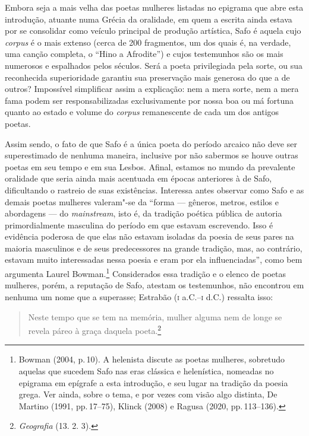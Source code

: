 Embora seja a mais velha das poetas mulheres listadas no epigrama que abre esta
introdução, atuante numa Grécia da oralidade, em quem a escrita ainda estava
por se consolidar como veículo principal de produção artística, Safo é aquela
cujo \textit{corpus} é o mais extenso (cerca de 200 fragmentos, um dos quais é,
na verdade, uma canção completa, o “Hino a Afrodite”) e cujos testemunhos são
os mais numerosos e espalhados pelos séculos. Será a poeta
privilegiada pela sorte, ou sua reconhecida superioridade garantiu sua
preservação mais generosa do que a de outros?
Impossível simplificar assim a explicação:
nem a mera sorte, nem a mera fama podem ser responsabilizadas exclusivamente por
nossa boa ou má fortuna quanto ao estado e volume do \textit{corpus}
remanescente de cada um dos antigos poetas.

Assim sendo, o fato de que Safo é a única poeta do período
arcaico não deve ser superestimado de nenhuma maneira, inclusive por não sabermos se houve outras poetas em seu tempo e em sua Lesbos. Afinal, estamos no mundo da prevalente oralidade que seria ainda mais acentuada em épocas anteriores à de Safo, dificultando o rastreio de suas existências. Interessa antes observar como Safo e as demais poetas mulheres valeram"-se da ``forma --- gêneros, metros, estilos e abordagens --- do \emph{mainstream}, isto é, da tradição poética pública de autoria primordialmente masculina do período em que estavam escrevendo. Isso é evidência poderosa de que elas não estavam isoladas da poesia de seus pares na maioria masculinos e de seus predecessores na grande tradição, mas, ao contrário, estavam muito interessadas nessa poesia e eram por ela influenciadas'', como bem argumenta Laurel Bowman.\footnote{Bowman (2004, p.\,10). A helenista discute as poetas mulheres, sobretudo aquelas que sucedem Safo nas eras clássica e helenística, nomeadas no epigrama em epígrafe a esta introdução, e seu lugar na tradição da poesia grega. Ver ainda, sobre o tema, e por vezes com visão algo distinta, De Martino (1991, pp.\,17--75), Klinck (2008) e Ragusa (2020, pp.\,113--136).}
Considerados essa tradição e o elenco de poetas mulheres, porém,
a reputação de Safo, atestam os
testemunhos, não encontrou em nenhuma um nome que a
superasse; Estrabão (\textsc{i} a.C.--\textsc{i} d.C.) ressalta isso: 

\begin{quote}
Neste tempo que se tem na memória, mulher alguma nem de longe se revela páreo à graça daquela poeta.\footnote{ \textit{Geografia} (13. 2. 3).}
\end{quote}

